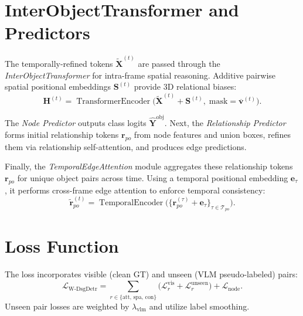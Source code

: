 \documentclass{article}
\newcommand{\op}[1]{\operatorname{#1}}
\newcommand{\mat}[1]{\bm{#1}}
\begin{document}
\section{InterObjectTransformer and Predictors}
\label{sec:iot_predictors}

The temporally-refined tokens $\tilde{\mat{X}}^{(t)}$ are passed through the \emph{InterObjectTransformer} for intra-frame spatial reasoning. Additive pairwise spatial positional embeddings $\mat{S}^{(t)}$ provide 3D relational biases:
\begin{equation}
    \mat{H}^{(t)} = \op{TransformerEncoder}\bigl(\tilde{\mat{X}}^{(t)} + \mat{S}^{(t)},\; \text{mask}=\overline{\mat{v}}^{(t)}\bigr).
    \label{eq:iot}
\end{equation}

The \emph{Node Predictor} outputs class logits $\hat{\mat{Y}}^{\text{obj}}$. Next, the \emph{Relationship Predictor} forms initial relationship tokens $\mat{r}_{po}$ from node features and union boxes, refines them via relationship self-attention, and produces edge predictions.

Finally, the \emph{TemporalEdgeAttention} module aggregates these relationship tokens $\mat{r}_{po}$ for unique object pairs across time. Using a temporal positional embedding $\mat{e}_\tau$, it performs cross-frame edge attention to enforce temporal consistency:
\begin{equation}
    \tilde{\mat{r}}_{po}^{(t)} = \op{TemporalEncoder}\bigl(\{{\mat{r}}_{po}^{(\tau)} + \mat{e}_{\tau}\}_{\tau \in \mathcal{T}_{po}}\bigr).
    \label{eq:tea}
\end{equation}

\section{Loss Function}
\label{sec:loss}

The loss incorporates visible (clean GT) and unseen (VLM pseudo-labeled) pairs:
\begin{equation}
    \mathcal{L}_{\text{W-DsgDetr}} = \sum_{r \in \{\text{att, spa, con}\}} \bigl(\mathcal{L}_{r}^{\text{vis}} + \mathcal{L}_{r}^{\text{unseen}}\bigr) + \mathcal{L}_{\text{node}}.
    \label{eq:loss}
\end{equation}
Unseen pair losses are weighted by $\lambda_{\text{vlm}}$ and utilize label smoothing.
\end{document}
